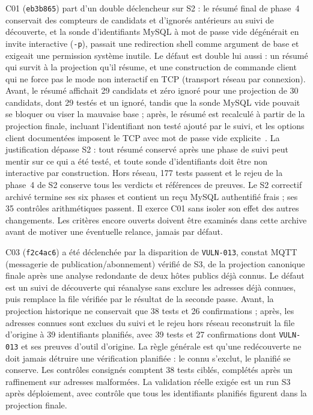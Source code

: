 \documentclass[11pt,a4paper]{article}
\newcommand{\code}[1]{{\urlstyle{tt}\nolinkurl{#1}}}
\begin{document}
C01 (\code{eb3b865}) part d'un double déclencheur sur S2 : le résumé final de phase~4 conservait des compteurs de candidats et d'ignorés antérieurs au suivi de découverte, et la sonde d'identifiants MySQL à mot de passe vide dégénérait en invite interactive (\code{-p}), passait une redirection shell comme argument de base et exigeait une permission système inutile. Le défaut est double lui aussi : un résumé qui survit à la projection qu'il résume, et une construction de commande client qui ne force pas le mode non interactif en TCP (transport réseau par connexion). Avant, le résumé affichait 29 candidats et zéro ignoré pour une projection de 30 candidats, dont 29 testés et un ignoré, tandis que la sonde MySQL vide pouvait se bloquer ou viser la mauvaise base ; après, le résumé est recalculé à partir de la projection finale, incluant l'identifiant non testé ajouté par le suivi, et les options client documentées imposent le TCP avec mot de passe vide explicite~\cite{code}. La justification dépasse S2 : tout résumé conservé après une phase de suivi peut mentir sur ce qui a été testé, et toute sonde d'identifiants doit être non interactive par construction. Hors réseau, 177 tests passent et le rejeu de la phase~4 de S2 conserve tous les verdicts et références de preuves. Le S2 correctif archivé termine ses six phases et contient un reçu MySQL authentifié frais ; ses 35 contrôles arithmétiques passent. Il exerce C01 sans isoler son effet des autres changements. Les critères encore ouverts doivent être examinés dans cette archive avant de motiver une éventuelle relance, jamais par défaut.

C03 (\code{f2c4ac6}) a été déclenchée par la disparition de \code{VULN-013}, constat MQTT (messagerie de publication/abonnement) vérifié de S3, de la projection canonique finale après une analyse redondante de deux hôtes publics déjà connus. Le défaut est un suivi de découverte qui réanalyse sans exclure les adresses déjà connues, puis remplace la file vérifiée par le résultat de la seconde passe. Avant, la projection historique ne conservait que 38 tests et 26 confirmations ; après, les adresses connues sont exclues du suivi et le rejeu hors réseau reconstruit la file d'origine à 39 identifiants planifiés, avec 39 tests et 27 confirmations dont \code{VULN-013} et ses preuves d'outil d'origine. La règle générale est qu'une redécouverte ne doit jamais détruire une vérification planifiée : le connu s'exclut, le planifié se conserve. Les contrôles consignés comptent 38 tests ciblés, complétés après un raffinement sur adresses malformées. La validation réelle exigée est un run S3 après déploiement, avec contrôle que tous les identifiants planifiés figurent dans la projection finale.
\end{document}
